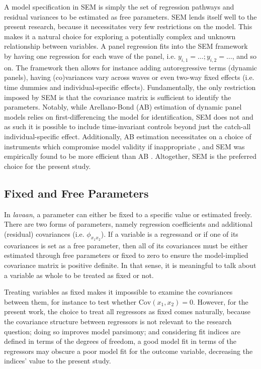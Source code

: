 A model specification in SEM is simply the set of regression pathways and residual variances to be estimated as free
parameters.
SEM lends itself well to the present research, because it necessitates very few restrictions on the model.
This makes it a natural choice for exploring a potentially complex and unknown relationship between variables.
A panel regression fits into the SEM framework by having one regression for each wave of the panel,
i.e. $y_{i,1} = \ldots; y_{i, 2} = \ldots$, and so on. The framework then allows for instance adding autoregressive terms
(dynamic panels), having (co)variances vary across waves or even two-way fixed effects
(i.e. time dummies and individual-specific effects).
Fundamentally, the only restriction imposed by SEM is that the covariance matrix is sufficient to identify the parameters.
Notably, while Arellano-Bond (AB) estimation of dynamic panel models relies on first-differencing the model for identification,
SEM does not and as such it is possible to include time-invariant controls beyond just the catch-all individual-specific effect.
Additionally, AB estimation necessitates on a choice of instruments which compromise model validity if inappropriate
\cite{bazzi2013blunt}, and SEM was empirically found to be more efficient than AB \cite{leszczensky2022deal}.
Altogether, SEM is the preferred choice for the present study.

\subsection{Fixed and Free Parameters}
\label{sec:methods:fixed_free_parameters}
In \textit{lavaan}, a parameter can either be fixed to a specific value or estimated freely.
There are two forms of parameters, namely regression coefficients and additional (residual) covariances (i.e. $\phi_{x_1 x_2}$).
If a variable is a regressand or if one of its covariances is set as a free parameter, then all of its covariances
must be either estimated through free parameters or fixed to zero to ensure the model-implied covariance matrix is
positive definite.
In that sense, it is meaningful to talk about a variable as whole to be treated as fixed or not.

Treating variables as fixed makes it impossible to examine the covariances between them,
for instance to test whether $\text{Cov}(x_1, x_2) = 0$.
However, for the present work, the choice to treat all regressors as fixed comes naturally,
because the covariance structure between regressors is not relevant to the research question;
doing so improves model parsimony;
and considering fit indices are defined in terms of the degrees of freedom,
a good model fit in terms of the regressors may obscure a poor model fit for the outcome variable,
decreasing the indices' value to the present study.

